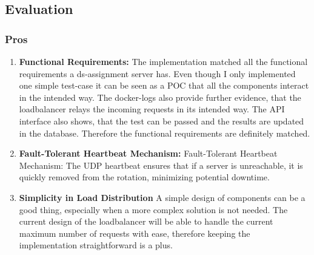 \documentclass{article}
\begin{document}
\newpage

\subsection{Evaluation}
\subsubsection{Pros}
\begin{enumerate}
\item \textbf{Functional Requirements:}
The implementation matched all the functional requirements a ds-assignment server has. Even though I only implemented one simple test-case it can be seen as a POC that all the components interact in the intended way.
The docker-logs also provide further evidence, that the loadbalancer relays the incoming requests in its intended way. The API interface also shows, that the test can be passed and the results are updated in the database. Therefore the functional requirements are definitely matched.
\item \textbf{Fault-Tolerant Heartbeat Mechanism:}
Fault-Tolerant Heartbeat Mechanism: The UDP heartbeat ensures that if a server is unreachable, it is quickly removed from the rotation, minimizing potential downtime.
\item \textbf{Simplicity in Load Distribution}
A simple design of components can be a good thing, especially when a more complex solution is not needed. The current design of the loadbalancer will be able to handle the current maximum number of requests with ease, therefore keeping the implementation straightforward is a plus.
\end{enumerate}
\end{document}
